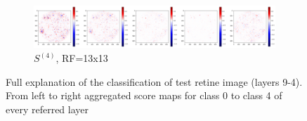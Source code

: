 \documentclass[preprint]{elsarticle}
\theoremstyle{definition} %
\theoremstyle{remark}
\begin{document}
\begin{figure}[h!]
	\begin{subfigure}[b]{\textwidth}
		\includegraphics[width=\textwidth]{figures/score-prop-23713_left/score_rf13.png}
		\caption{$S^{(4)}$, RF=13x13}
		\label{fig:score_rf13}
	\end{subfigure}
	
	\caption{Full explanation of the classification of test retine image (layers 9-4). From left to right aggregated score maps for class 0 to class 4 of every referred layer}
	\label{fig:test1_score_explanation2_rf}
\end{figure}
\end{document}
